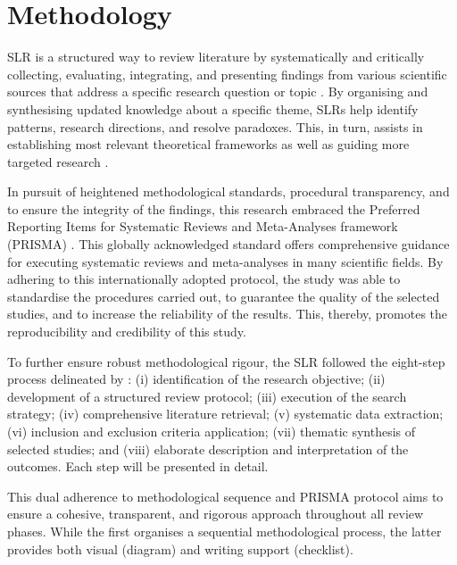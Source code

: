 \documentclass[english]{textolivre}
\begin{document}
\section{Methodology}\label{sec-organizacao}
SLR is a structured way to review literature by systematically and critically collecting, evaluating, integrating, and presenting findings from various scientific sources that address a specific research question or topic \cite{sarmento2024revisao,smela2023rapid}. By organising and synthesising updated knowledge about a specific theme, SLRs help identify patterns, research directions, and resolve paradoxes. This, in turn, assists in establishing most relevant theoretical frameworks as well as guiding more targeted research \cite{snyder2019literature}.

In pursuit of heightened methodological standards, procedural transparency, and to ensure the integrity of the findings, this research embraced the Preferred Reporting Items for Systematic Reviews and Meta-Analyses framework (PRISMA) \cite{page2024prisma}. This globally acknowledged standard offers comprehensive guidance for executing systematic reviews and meta-analyses in many scientific fields. By adhering to this internationally adopted protocol, the study was able to standardise the procedures carried out, to guarantee the quality of the selected studies, and to increase the reliability of the results. This, thereby, promotes the reproducibility and credibility of this study.

To further ensure robust methodological rigour, the SLR followed the eight-step process delineated by \textcite{okoli2019guia}: (i) identification of the research objective; (ii) development of a structured review protocol; (iii) execution of the search strategy; (iv) comprehensive literature retrieval; (v) systematic data extraction; (vi) inclusion and exclusion criteria application; (vii) thematic synthesis of selected studies; and (viii) elaborate description and interpretation of the outcomes. Each step will be presented in detail.

This dual adherence to  methodological sequence and PRISMA protocol aims to ensure a cohesive, transparent, and rigorous approach throughout all review phases. While the first organises a sequential methodological process, the latter provides both visual (diagram) and writing support (checklist).
\end{document}
